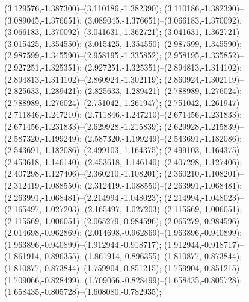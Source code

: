  (3.129576,-1.387300)--(3.110186,-1.382390);
 (3.110186,-1.382390)--(3.089045,-1.376651);
 (3.089045,-1.376651)--(3.066183,-1.370092);
 (3.066183,-1.370092)--(3.041631,-1.362721);
 (3.041631,-1.362721)--(3.015425,-1.354550);
 (3.015425,-1.354550)--(2.987599,-1.345590);
 (2.987599,-1.345590)--(2.958195,-1.335852);
 (2.958195,-1.335852)--(2.927251,-1.325351);
 (2.927251,-1.325351)--(2.894813,-1.314102);
 (2.894813,-1.314102)--(2.860924,-1.302119);
 (2.860924,-1.302119)--(2.825633,-1.289421);
 (2.825633,-1.289421)--(2.788989,-1.276024);
 (2.788989,-1.276024)--(2.751042,-1.261947);
 (2.751042,-1.261947)--(2.711846,-1.247210);
 (2.711846,-1.247210)--(2.671456,-1.231833);
 (2.671456,-1.231833)--(2.629928,-1.215839);
 (2.629928,-1.215839)--(2.587320,-1.199249);
 (2.587320,-1.199249)--(2.543691,-1.182086);
 (2.543691,-1.182086)--(2.499103,-1.164375);
 (2.499103,-1.164375)--(2.453618,-1.146140);
 (2.453618,-1.146140)--(2.407298,-1.127406);
 (2.407298,-1.127406)--(2.360210,-1.108201);
 (2.360210,-1.108201)--(2.312419,-1.088550);
 (2.312419,-1.088550)--(2.263991,-1.068481);
 (2.263991,-1.068481)--(2.214994,-1.048023);
 (2.214994,-1.048023)--(2.165497,-1.027203);
 (2.165497,-1.027203)--(2.115569,-1.006051);
 (2.115569,-1.006051)--(2.065279,-0.984596);
 (2.065279,-0.984596)--(2.014698,-0.962869);
 (2.014698,-0.962869)--(1.963896,-0.940899);
 (1.963896,-0.940899)--(1.912944,-0.918717);
 (1.912944,-0.918717)--(1.861914,-0.896355);
 (1.861914,-0.896355)--(1.810877,-0.873844);
 (1.810877,-0.873844)--(1.759904,-0.851215);
 (1.759904,-0.851215)--(1.709066,-0.828499);
 (1.709066,-0.828499)--(1.658435,-0.805728);
 (1.658435,-0.805728)--(1.608080,-0.782935);
